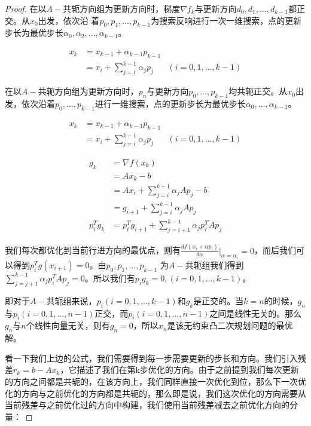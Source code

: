 \documentclass{ML}
\begin{document}
\begin{proof}
	在以\(A-\)共轭方向组为更新方向时，梯度\(\nabla f_k\)与更新方向\(d_0,d_1,\dots,d_{k-1}\)都正交。从\(x_0\)出发，依次沿 着\(p_0,p_1,…,p_{k-1}\)为搜索反响进行一次一维搜索，点的更新步长为最优步长\(\alpha_0,\alpha_2,\dots,\alpha_{k-1}\)。

	\[\begin{array}{lll}
			x_k & = x_{k-1} + \alpha_{k-1}p_{k-1}                           \\
			    & = x_i + \sum_{j=i}^{k-1}\alpha_{j}p_{j} & (i = 0,1,…,k-1)
		\end{array}\]

	在以\(A-\)共轭方向组为更新方向时，\(p_n\)与更新方向\(p_0,…,p_{k-1}\)均共轭正交。从\(x_0\)出发，依次沿着\(p_0,…,p_{k-1}\)进行一维搜索，点的更新步长为最优步长\(\alpha_0,…,\alpha_{k-1}\)。

	\[\begin{array}{lll}
			x_k & = x_{k-1} + \alpha_{k-1}p_{k-1}                           \\
			    & = x_i + \sum_{j=i}^{k-1}\alpha_{j}p_{j} & (i = 0,1,…,k-1)
		\end{array}\]

	\[\begin{array}{ll}
			g_k      & = ∇f(x_k)                                            \\
			         & = Ax_k - b                                           \\
			         & = Ax_{i} + \sum^{k-1}_{j=i}\alpha_jAp_j - b          \\
			         & = g_{i+1} + \sum^{k-1}_{j=i}\alpha_jAp_j             \\
			p_i^Tg_k & = p_i^Tg_{i+1} + \sum_{j=i+1}^{k-1}\alpha_jp_i^TAp_j
		\end{array}\]

	我们每次都优化到当前行进方向的最优点，则有\(\frac{df(x_i + \alpha p_i)}{d\alpha}|_{\alpha=\alpha_i} = 0\)，而后我们可以得到\(p_i^Tg(x_{i+1}) = 0\)。由\(p_0,p_1,…,p_{k-1}\) 为\(A-\)共轭组我们得到\(\sum_{j=j+1}^{k-1}\alpha_jp_i^TAp_j = 0\)。所以我们有\(p_ig_k = 0,(i=0,1,…,k-1)\)。

	即对于\(A-\)共轭组来说，\(p_i(i=0,1,…,k-1)\)和\(g_k\)是正交的。当\(k=n\)的时候，\(g_n\)与\(p_i(i=0,1,…,n-1)\)正交，而\(p_i(i=0,1,…,n-1)\)之间是线性无关的。那么\(g_n\)与\(n\)个线性向量无关，则有\(g_n=0\)，所以\(x_n\)是该无约束凸二次规划问题的最优解。

	看一下我们上边的公式，我们需要得到每一步需要更新的步长和方向。我们引入残差\(r_k = b - Ax_k\)，它描述了我们在第k步优化的方向。由于之前提到我们每次更新的方向之间都是共轭的，在该方向上，我们同样直接一次优化到位，那么下一次优化的方向与之前优化的方向都是共轭的，那么即是说，我们这次优化的方向需要从当前残差与之前优化过的方向中构建，我们使用当前残差减去之前优化方向的分量：


\end{proof}
\end{document}
